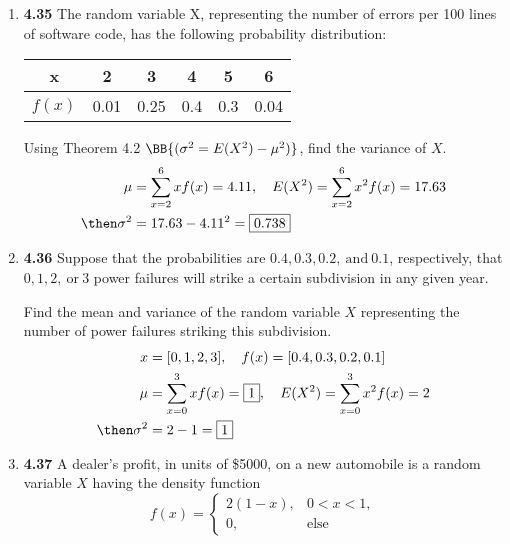 \documentclass[basic, header]{nosvagor-notes}
\begin{document}
\begin{enumerate}[leftmargin=1.5em, itemsep=2em]

  \item \textbf{4.35} The random variable X, representing the number of
    errors per 100 lines of software code, has the following probability
    distribution:

    \begin{table}[h]
      \centering
      \begin{tabular}{c|ccccc}
        x &  2 & 3 & 4  & 5 & 6 \\
        \midrule
        \(f(x)\)  & 0.01 & 0.25 &0.4 & 0.3 & 0.04 \\
      \end{tabular}
    \end{table}

    Using Theorem 4.2 \(\BB{(\sigma^2 = E(X^2) - \mu^2) }\), find the
    variance of \(X\).
    \begin{align*}
      \mu &= \sum_{x=2}^{6} xf(x) = 4.11, \quad
      E(X^2) = \sum_{x=2}^{6} x^2 f(x) = 17.63 \\
      \then \sigma^2 &= 17.63 - 4.11^2 = \boxed{0.738}
    \end{align*}

  \item \textbf{4.36} Suppose that the probabilities are \(0.4, 0.3, 0.2,
    ~\text{and}~ 0.1\), respectively, that \(0, 1, 2, ~\text{or}~ 3\) power
    failures will strike a certain subdivision in any given year.

    Find the mean and variance of the random variable \(X\) representing the
    number of power failures striking this subdivision.
    \begin{align*}
      x &= [0,1,2,3], \quad f(x) = [0.4,0.3,0.2,0.1] \\
      \mu &= \sum_{x=0}^{3} xf(x) = \boxed{1}, \quad
      E(X^2) = \sum_{x=0}^{3} x^2 f(x) = 2 \\
      \then \sigma^2 &= 2 - 1 = \boxed{1}
    \end{align*}

  \item \textbf{4.37} A dealer’s profit, in units of \$5000, on a new
    automobile is a random variable \(X\) having the density function
    \[%
      f(x) =
      \begin{cases}
        2(1-x),			& 0 < x < 1, \\
        0, & \text{else}
      \end{cases}
    \]%


\end{enumerate}
\end{document}
